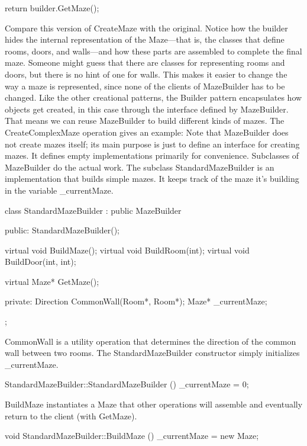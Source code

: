 \documentclass{report}
\begin{document}
\begin{itemize}
\begin{cppcode}
{                        return builder.GetMaze();
                    }
                \end{cppcode}
                \bigbreak \noindent 
                Compare this version of CreateMaze with the original. Notice how the builder hides the internal representation of the Maze—that is, the classes that define rooms, doors, and walls—and how these parts are assembled to complete the final maze. Someone might guess that there are classes for representing rooms and doors, but there is no hint of one for walls. This makes it easier to change the way a maze is represented, since none of the clients of MazeBuilder has to be changed.
                \bigbreak \noindent 
                Like the other creational patterns, the Builder pattern encapsulates how objects get created, in this case through the interface defined by MazeBuilder. That means we can reuse MazeBuilder to build different kinds of mazes. The CreateComplexMaze operation gives an example:
                \bigbreak \noindent 
                Note that MazeBuilder does not create mazes itself; its main purpose is just to define an interface for creating mazes. It defines empty implementations primarily for convenience. Subclasses of MazeBuilder do the actual work.
                \bigbreak \noindent 
                The subclass StandardMazeBuilder is an implementation that builds simple mazes. It keeps track of the maze it's building in the variable \_currentMaze.
                \bigbreak \noindent 
                \begin{cppcode}
                    class StandardMazeBuilder : public MazeBuilder {
                    public:
                        StandardMazeBuilder();

                        virtual void BuildMaze();
                        virtual void BuildRoom(int);
                        virtual void BuildDoor(int, int);

                        virtual Maze* GetMaze();

                    private:
                        Direction CommonWall(Room*, Room*);
                        Maze* _currentMaze;
                    };
                \end{cppcode}
                \bigbreak \noindent 
                CommonWall is a utility operation that determines the direction of the common wall between two rooms.
                \bigbreak \noindent 
                The StandardMazeBuilder constructor simply initializes \_currentMaze.
                \bigbreak \noindent 
                \begin{cppcode}
                    StandardMazeBuilder::StandardMazeBuilder () {
                        _currentMaze = 0;
                    }
                \end{cppcode}
                \bigbreak \noindent 
                BuildMaze instantiates a Maze that other operations will assemble and eventually return to the client (with GetMaze).
                \bigbreak \noindent 
                \begin{cppcode}
                    void StandardMazeBuilder::BuildMaze () {
                        _currentMaze = new Maze;
                    }


\end{cppcode}
\end{itemize}
\end{document}

